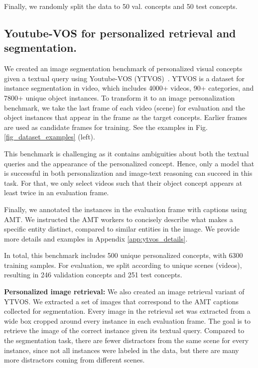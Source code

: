 \documentclass[runningheads]{llncs}
\newcommand{\figref}[1]{Fig. \ref{#1}}
\begin{document}
Finally, we randomly split the data to 50 val. concepts and 50 test concepts.

\subsection{Youtube-VOS for personalized retrieval and segmentation.}
We created an image segmentation benchmark of personalized visual concepts given a textual query using Youtube-VOS (YTVOS)~\cite{xu2018youtube}. YTVOS is a dataset for instance segmentation in video, which includes 4000+ videos, 90+ categories, and 7800+ unique object instances. To transform it to an image personalization benchmark, we take the last frame of each video (scene) for evaluation and the object instances that appear in the frame as the target concepts. Earlier frames are used as candidate frames for training. See the examples in \figref{fig_dataset_examples} (left).

This benchmark is challenging as it contains ambiguities about both the textual queries and the appearance of the personalized concept. Hence, only a model that is successful in both personalization and image-text reasoning can succeed in this task. For that, we only select videos such that their object concept appears at least twice in an evaluation frame. 

Finally, we annotated the instances in the evaluation frame with captions using AMT. We instructed the AMT workers to concisely describe what makes a specific entity distinct, compared to similar entities in the image. We provide more details and examples in Appendix \ref{app:ytvos_details}.

In total, this benchmark includes 500 unique personalized concepts, with 6300 training samples. For evaluation, we split according to unique scenes (videos), resulting in 246 validation concepts and 251 test concepts.

\textbf{Personalized image retrieval:}
We also created an image retrieval variant of YTVOS. We extracted a set of images that correspond to the AMT captions collected for segmentation. Every image in the retrieval set was extracted from a wide box cropped around every instance in each evaluation frame. The goal is to retrieve the image of the correct instance given its textual query. Compared to the segmentation task, there are fewer distractors from the same scene for every instance, since not all instances were labeled in the data, but there are many more distractors coming from different scenes.
\end{document}
